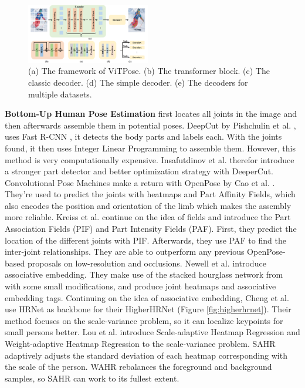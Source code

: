 \documentclass[conference]{IEEEtran}
\begin{document}
\begin{figure}[h]
	\centering
	\includegraphics[width=0.48\textwidth]{vitpose}%
	\caption{
		(a) The framework of ViTPose. (b) The transformer block. (c) The classic decoder. (d) The simple decoder. (e) The decoders for multiple datasets. \cite{xu2022}
	}
	\label{fig:vitpose}
\end{figure}

\textbf{Bottom-Up Human Pose Estimation} first locates all joints in the image and then afterwards assemble them in potential poses.
DeepCut by Pishchulin et al. \cite{Pishchulin2015}, uses Fast R-CNN \cite{Ren2015}, it detects the body parts and labels each.
With the joints found, it then uses Integer Linear Programming to assemble them.
However, this method is very computationally expensive.
Insafutdinov et al. \cite{Insafutdinov2016} therefor introduce a stronger part detector and better optimization strategy with DeeperCut.
Convolutional Pose Machines make a return with OpenPose by Cao et al. \cite{Cao2018}.
They're used to predict the joints with heatmaps and Part Affinity Fields, which also encodes the position and orientation of the limb which makes the assembly more reliable.
Kreiss et al. \cite{Kreiss2019} continue on the idea of fields and introduce the Part Association Fields (PIF) and Part Intensity Fields (PAF).
First, they predict the location of the different joints with PIF.
Afterwards, they use PAF to find the inter-joint relationships.
They are able to outperform any previous OpenPose-based proposals on low-resolution and occlusions.
Newell et al. \cite{Newell2016-2} introduce associative embedding.
They make use of the stacked hourglass network from \cite{Newell2016} with some small modifications, and produce joint heatmaps and associative embedding tags.
Continuing on the idea of associative embedding, Cheng et al. \cite{Cheng2019} use HRNet \cite{Sun2019} as backbone for their HigherHRNet (Figure \ref{fig:higherhrnet}).
Their method focuses on the scale-variance problem, so it can localize keypoints for small persons better.
Lou et al. \cite{Lou2020} introduce Scale-adaptive Heatmap Regression and Weight-adaptive Heatmap Regression to the scale-variance problem.
SAHR adaptively adjusts the standard deviation of each heatmap corresponding with the scale of the person.
WAHR rebalances the foreground and background samples, so SAHR can work to its fullest extent.
\end{document}
